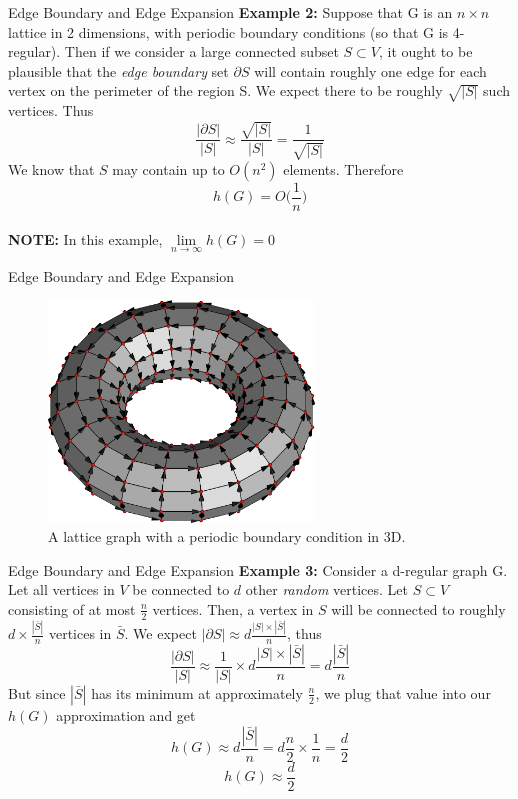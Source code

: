 \documentclass[10pt]{beamer}
\begin{document}
\begin{frame}[t]{Edge Boundary and Edge Expansion}
    \textbf{Example 2:} Suppose that G is an $n\times n$ lattice in 2 dimensions, with periodic boundary conditions (so that G is 4-regular). Then if we consider a large connected subset $S \subset V$, it ought to be plausible that the \textit{edge boundary} set $\partial S$ will contain roughly one edge for each vertex on the perimeter of the region S. We expect there to be roughly $\sqrt{|S|}$ such vertices. 
    \pause{} Thus\\
    \[\frac{|\partial S|}{|S|} \approx \frac{\sqrt{|S|}}{|S|} = \frac{1}{\sqrt{|S|}}\]
    \pause{}
    We know that $S$ may contain up to $O(n^{2})$ elements.
    \pause{}
    Therefore
    \[h(G) = O\Big(\frac{1}{n}\Big)\]\\
    \pause{}
    \textbf{NOTE:} In this example, $\lim\limits_{n \rightarrow \infty} h(G) = 0$
\end{frame}

\begin{frame}{Edge Boundary and Edge Expansion}
    \begin{figure}
        \centering
        \includegraphics[width=200pt]{iu}
        \caption{A lattice graph with a periodic boundary condition in 3D.}
    \end{figure}
\end{frame}

\begin{frame}[t]{Edge Boundary and Edge Expansion}
    \textbf{Example 3:} Consider a d-regular graph G. Let all vertices in $V$ be connected to $d$ other \textit{random} vertices. Let $S \subset V$ consisting of at most $\frac{n}{2}$ vertices. 
    \pause{}
    Then, a vertex in $S$ will be connected to roughly $d \times \frac{|\bar{S}|}{n}$ vertices in $\bar{S}$. We expect $|\partial S| \approx d \frac{|S|\times|\bar{S}|}{n}$, \pause{}
    thus \[\frac{|\partial S|}{|S|} \approx \frac{1}{|S|} \times d\frac{|S|\times|\bar{S}|}{n} = d\frac{|\bar{S}|}{n}\]
    \pause{}
    But since $|\bar{S}|$ has its minimum at approximately $\frac{n}{2}$, 
    \pause{}
    we plug that value into our $h(G)$ approximation and get \[h(G) \approx d\frac{|\bar{S}|}{n} = d \frac{n}{2} \times \frac{1}{n}=\frac{d}{2}\]
    \pause{}
    \[h(G) \approx \frac{d}{2}\]
\end{frame}
\end{document}
